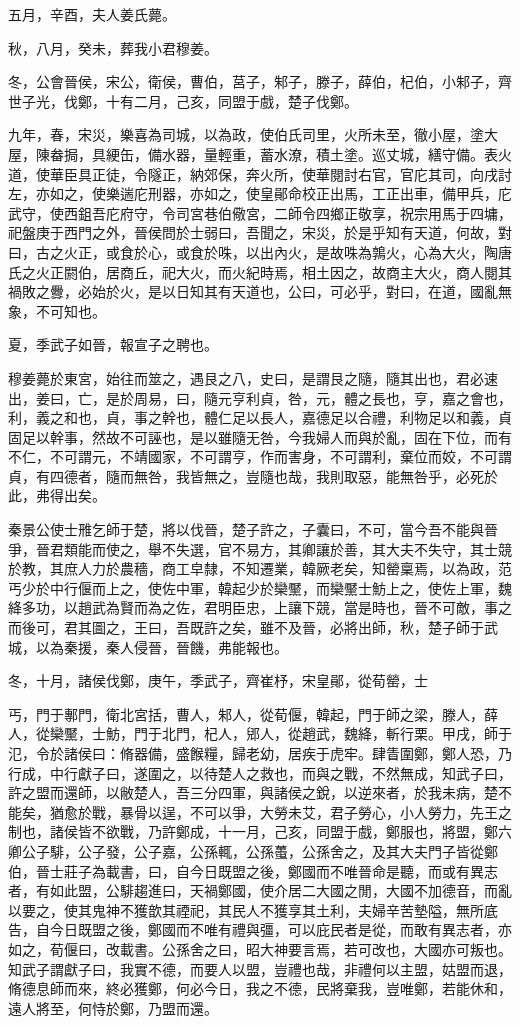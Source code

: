 \begin{pinyinscope}
五月，辛酉，夫人姜氏薨。

秋，八月，癸未，葬我小君穆姜。

冬，公會晉侯，宋公，衛侯，曹伯，莒子，邾子，滕子，薛伯，杞伯，小邾子，齊世子光，伐鄭，十有二月，己亥，同盟于戲，楚子伐鄭。

九年，春，宋災，樂喜為司城，以為政，使伯氏司里，火所未至，徹小屋，塗大屋，陳畚挶，具綆缶，備水器，量輕重，蓄水潦，積土塗。巡丈城，繕守備。表火道，使華臣具正徒，令隧正，納郊保，奔火所，使華閱討右官，官庀其司，向戌討左，亦如之，使樂遄庀刑器，亦如之，使皇鄖命校正出馬，工正出車，備甲兵，庀武守，使西鉏吾庀府守，令司宮巷伯儆宮，二師令四鄉正敬享，祝宗用馬于四墉，祀盤庚于西門之外，晉侯問於士弱曰，吾聞之，宋災，於是乎知有天道，何故，對曰，古之火正，或食於心，或食於咮，以出內火，是故咮為鶉火，心為大火，陶唐氏之火正閼伯，居商丘，祀大火，而火紀時焉，相土因之，故商主大火，商人閱其禍敗之釁，必始於火，是以日知其有天道也，公曰，可必乎，對曰，在道，國亂無象，不可知也。

夏，季武子如晉，報宣子之聘也。

穆姜薨於東宮，始往而筮之，遇艮之八，史曰，是謂艮之隨，隨其出也，君必速出，姜曰，亡，是於周易，曰，隨元亨利貞，咎，元，體之長也，亨，嘉之會也，利，義之和也，貞，事之幹也，體仁足以長人，嘉德足以合禮，利物足以和義，貞固足以幹事，然故不可誣也，是以雖隨无咎，今我婦人而與於亂，固在下位，而有不仁，不可謂元，不靖國家，不可謂亨，作而害身，不可謂利，棄位而姣，不可謂貞，有四德者，隨而無咎，我皆無之，豈隨也哉，我則取惡，能無咎乎，必死於此，弗得出矣。

秦景公使士雃乞師于楚，將以伐晉，楚子許之，子囊曰，不可，當今吾不能與晉爭，晉君類能而使之，舉不失選，官不易方，其卿讓於善，其大夫不失守，其士競於教，其庶人力於農穡，商工皁隸，不知遷業，韓厥老矣，知罃稟焉，以為政，范丐少於中行偃而上之，使佐中軍，韓起少於欒黶，而欒黶士魴上之，使佐上軍，魏絳多功，以趙武為賢而為之佐，君明臣忠，上讓下競，當是時也，晉不可敵，事之而後可，君其圖之，王曰，吾既許之矣，雖不及晉，必將出師，秋，楚子師于武城，以為秦援，秦人侵晉，晉饑，弗能報也。

冬，十月，諸侯伐鄭，庚午，季武子，齊崔杼，宋皇鄖，從荀罃，士

丐，門于鄟門，衛北宮括，曹人，邾人，從荀偃，韓起，門于師之梁，滕人，薛人，從欒黶，士魴，門于北門，杞人，郳人，從趙武，魏絳，斬行栗。甲戌，師于氾，令於諸侯曰：脩器備，盛餱糧，歸老幼，居疾于虎牢。肆眚圍鄭，鄭人恐，乃行成，中行獻子曰，遂圍之，以待楚人之救也，而與之戰，不然無成，知武子曰，許之盟而還師，以敝楚人，吾三分四軍，與諸侯之銳，以逆來者，於我未病，楚不能矣，猶愈於戰，暴骨以逞，不可以爭，大勞未艾，君子勞心，小人勞力，先王之制也，諸侯皆不欲戰，乃許鄭成，十一月，己亥，同盟于戲，鄭服也，將盟，鄭六卿公子騑，公子發，公子嘉，公孫輒，公孫蠆，公孫舍之，及其大夫門子皆從鄭伯，晉士莊子為載書，曰，自今日既盟之後，鄭國而不唯晉命是聽，而或有異志者，有如此盟，公騑趨進曰，天禍鄭國，使介居二大國之閒，大國不加德音，而亂以要之，使其鬼神不獲歆其禋祀，其民人不獲享其土利，夫婦辛苦墊隘，無所底告，自今日既盟之後，鄭國而不唯有禮與彊，可以庇民者是從，而敢有異志者，亦如之，荀偃曰，改載書。公孫舍之曰，昭大神要言焉，若可改也，大國亦可叛也。知武子謂獻子曰，我實不德，而要人以盟，豈禮也哉，非禮何以主盟，姑盟而退，脩德息師而來，終必獲鄭，何必今日，我之不德，民將棄我，豈唯鄭，若能休和，遠人將至，何恃於鄭，乃盟而還。


\end{pinyinscope}
